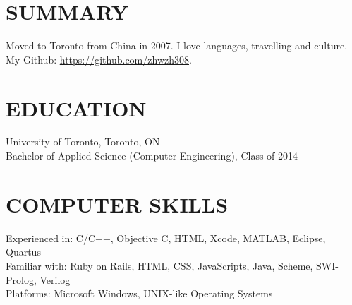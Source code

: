 \documentclass{res}
\begin{document}
 


\address{\bf Unit 808, 38 Dan Leckie Way\\Toronto, ON \space\space M5V 2V6\\(416)
795-0370\\\href{zhang@magniware.ca}{zhang@magniware.ca}}

\begin{resume}

\section{SUMMARY}          
    Moved to Toronto from China in 2007. I love languages, travelling and culture.
    My Github: \url{https://github.com/zhwzh308}.
 
\section{EDUCATION}          
    University of Toronto, Toronto, ON  \\        
    Bachelor of Applied Science (Computer Engineering), Class of 2014
    
\section{COMPUTER SKILLS}          
    Experienced in: C/C++, Objective C, HTML, Xcode, MATLAB, Eclipse, Quartus\\
    Familiar with: Ruby on Rails, HTML, CSS, JavaScripts, Java, Scheme, SWI-Prolog, Verilog\\
    Platforms: Microsoft Windows\textregistered, UNIX-like Operating Systems


\end{resume}
\end{document}
